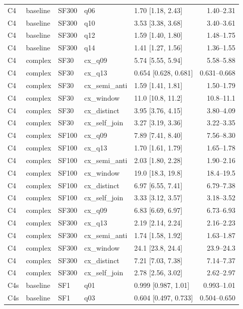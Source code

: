 \begin{longtable}{lllllr}
C4 & baseline & SF300 & q06 & 1.70 [1.18, 2.43] & 1.40--2.31 \\
C4 & baseline & SF300 & q10 & 3.53 [3.38, 3.68] & 3.40--3.61 \\
C4 & baseline & SF300 & q12 & 1.59 [1.40, 1.80] & 1.48--1.75 \\
C4 & baseline & SF300 & q14 & 1.41 [1.27, 1.56] & 1.36--1.55 \\
C4 & complex & SF30 & cx\_q09 & 5.74 [5.55, 5.94] & 5.58--5.88 \\
C4 & complex & SF30 & cx\_q13 & 0.654 [0.628, 0.681] & 0.631--0.668 \\
C4 & complex & SF30 & cx\_semi\_anti & 1.59 [1.41, 1.81] & 1.50--1.79 \\
C4 & complex & SF30 & cx\_window & 11.0 [10.8, 11.2] & 10.8--11.1 \\
C4 & complex & SF30 & cx\_distinct & 3.95 [3.76, 4.15] & 3.80--4.09 \\
C4 & complex & SF30 & cx\_self\_join & 3.27 [3.19, 3.36] & 3.22--3.35 \\
C4 & complex & SF100 & cx\_q09 & 7.89 [7.41, 8.40] & 7.56--8.30 \\
C4 & complex & SF100 & cx\_q13 & 1.70 [1.61, 1.79] & 1.65--1.78 \\
C4 & complex & SF100 & cx\_semi\_anti & 2.03 [1.80, 2.28] & 1.90--2.16 \\
C4 & complex & SF100 & cx\_window & 19.0 [18.3, 19.8] & 18.4--19.5 \\
C4 & complex & SF100 & cx\_distinct & 6.97 [6.55, 7.41] & 6.79--7.38 \\
C4 & complex & SF100 & cx\_self\_join & 3.33 [3.12, 3.57] & 3.18--3.52 \\
C4 & complex & SF300 & cx\_q09 & 6.83 [6.69, 6.97] & 6.73--6.93 \\
C4 & complex & SF300 & cx\_q13 & 2.19 [2.14, 2.24] & 2.16--2.23 \\
C4 & complex & SF300 & cx\_semi\_anti & 1.74 [1.58, 1.92] & 1.63--1.87 \\
C4 & complex & SF300 & cx\_window & 24.1 [23.8, 24.4] & 23.9--24.3 \\
C4 & complex & SF300 & cx\_distinct & 7.21 [7.03, 7.38] & 7.14--7.37 \\
C4 & complex & SF300 & cx\_self\_join & 2.78 [2.56, 3.02] & 2.62--2.97 \\
C4s & baseline & SF1 & q01 & 0.999 [0.987, 1.01] & 0.993--1.01 \\
C4s & baseline & SF1 & q03 & 0.604 [0.497, 0.733] & 0.504--0.650 \\

\end{longtable}
